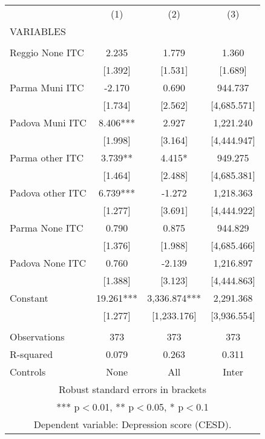 \begin{tabular}{lccc} \hline
 & (1) & (2) & (3) \\
VARIABLES &  &  &  \\ \hline
 &  &  &  \\
Reggio None ITC & 2.235 & 1.779 & 1.360 \\
 & [1.392] & [1.531] & [1.689] \\
Parma Muni ITC & -2.170 & 0.690 & 944.737 \\
 & [1.734] & [2.562] & [4,685.571] \\
Padova Muni ITC & 8.406*** & 2.927 & 1,221.240 \\
 & [1.998] & [3.164] & [4,444.947] \\
Parma other ITC & 3.739** & 4.415* & 949.275 \\
 & [1.464] & [2.488] & [4,685.381] \\
Padova other ITC & 6.739*** & -1.272 & 1,218.363 \\
 & [1.277] & [3.691] & [4,444.922] \\
Parma None ITC & 0.790 & 0.875 & 944.829 \\
 & [1.376] & [1.988] & [4,685.466] \\
Padova None ITC & 0.760 & -2.139 & 1,216.897 \\
 & [1.388] & [3.123] & [4,444.863] \\
Constant & 19.261*** & 3,336.874*** & 2,291.368 \\
 & [1.277] & [1,233.176] & [3,936.554] \\
 &  &  &  \\
Observations & 373 & 373 & 373 \\
R-squared & 0.079 & 0.263 & 0.311 \\
 Controls & None & All & Inter \\ \hline
\multicolumn{4}{c}{ Robust standard errors in brackets} \\
\multicolumn{4}{c}{ *** p$<$0.01, ** p$<$0.05, * p$<$0.1} \\
\multicolumn{4}{c}{ Dependent variable: Depression score (CESD).} \\
\end{tabular}
